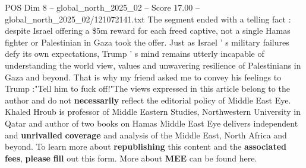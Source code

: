 \begin{textsample}{POS Dim 8 – global\_north\_2025\_02 – Score 17.00 – global\_north\_2025\_02/121072141.txt}
The segment ended with a telling fact : despite Israel offering a \$5m reward for each freed captive, not a single Hamas fighter or Palestinian in Gaza took the offer.
Just as Israel ' s military failures defy its own expectations, Trump ' s mind remains utterly incapable of understanding the world view, values and unwavering resilience of Palestinians in Gaza and beyond.
That is why my friend asked me to convey his feelings to Trump :"Tell him to fuck off!"The views expressed in this article belong to the author and do not \textbf{necessarily} reflect the editorial policy of Middle East Eye.
Khaled Hroub is professor of Middle Eastern Studies, Northwestern University in Qatar and author of two books on Hamas Middle East Eye delivers independent and \textbf{unrivalled} \textbf{coverage} and analysis of the Middle East, North Africa and beyond.
To learn more about \textbf{republishing} this content and the \textbf{associated} \textbf{fees}, \textbf{please} \textbf{fill} out this form.
More about \textbf{MEE} can be found here.

\end{textsample}
